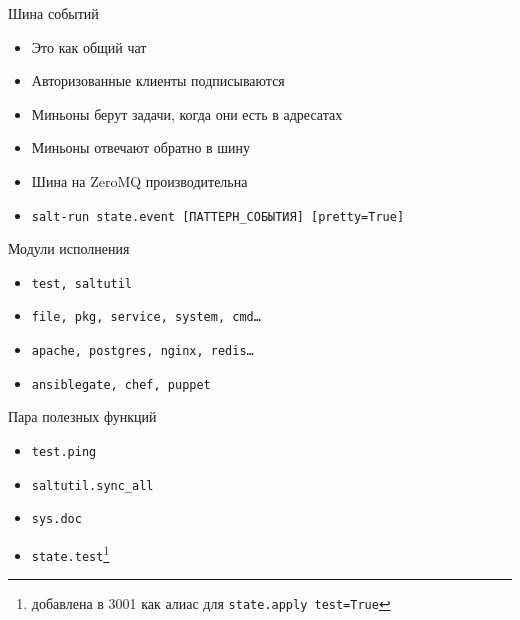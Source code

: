 \begin{Frame}{Шина событий}

  \begin{itemize}[<+-| alert@ +>]
    \item[{\faComments[regular]}] Это как общий чат
    \item[{\faBell[regular]}] Авторизованные клиенты подписываются
    \item[{\faHandPaper[regular]}] Миньоны берут задачи, когда они есть в адресатах
    \item[{\faCommentDots[regular]}] Миньоны отвечают обратно в шину
    \item[\faFighterJet] Шина на ZeroMQ производительна
    \item[\faTerminal] \texttt{salt-run state.event [ПАТТЕРН\_СОБЫТИЯ]
      [pretty=True]}
  \end{itemize}

\end{Frame}

\begin{Frame}{Модули исполнения}
  \ExampleNote{}

  \begin{itemize}[<+-| alert@ +>]
    \item \texttt{test, saltutil}
    \item \texttt{file, pkg, service, system, cmd\dots}
    \item \texttt{apache, postgres, nginx, redis\dots}
    \item \texttt{ansiblegate, chef, puppet}
  \end{itemize}
\end{Frame}

\begin{Frame}{Пара полезных функций}


  \begin{itemize}[<+-| alert@ +>]
    \item \texttt{test.ping}\vfill
    \item \texttt{saltutil.sync\_all}\vfill
    \item \texttt{sys.doc}\vfill
    \item \texttt{state.test}\footnote{добавлена в 3001 как алиас для
      \texttt{state.apply test=True}}\vfill
  \end{itemize}
  \vfill

\end{Frame}

